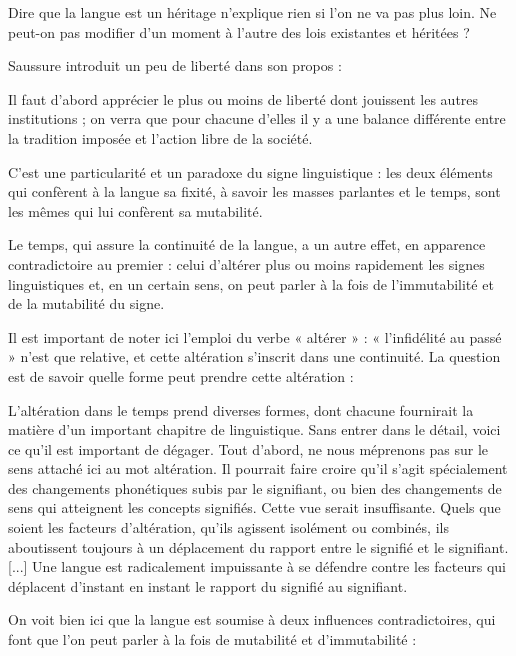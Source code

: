 \begin{lecture}{}
Dire que la langue est un héritage n’explique rien si l’on ne va pas plus loin. Ne peut-on pas modifier d’un moment à l’autre des lois existantes et héritées ?
\end{lecture}
Saussure introduit un peu de liberté dans son propos :
\begin{lecture}{}
Il faut d’abord apprécier le plus ou moins de liberté dont jouissent les autres institutions ; on verra que pour chacune d’elles il y a une balance différente entre la tradition imposée et l’action libre de la société.
\end{lecture}

C’est une particularité et un paradoxe du signe linguistique : les deux éléments qui confèrent à la langue sa fixité, à savoir les masses parlantes et le temps, sont les mêmes qui lui confèrent sa mutabilité.
\begin{lecture}{}
Le temps, qui assure la continuité de la langue, a un autre effet, en apparence contradictoire au premier : celui d’altérer plus ou moins rapidement les signes linguistiques et, en un certain sens, on peut parler à la fois de l’immutabilité et de la mutabilité du signe.
\end{lecture}
Il est important de noter ici l’emploi du verbe « altérer » : « l’infidélité au passé » n’est que relative, et cette altération s’inscrit dans une continuité. La question est de savoir quelle forme peut prendre cette altération :
\begin{lecture}{}
L’altération dans le temps prend diverses formes, dont chacune fournirait la matière d’un important chapitre de linguistique. Sans entrer dans le détail, voici ce qu’il est important de dégager. Tout d’abord, ne nous méprenons pas sur le sens attaché ici au mot altération. Il pourrait faire croire qu’il s’agit spécialement des changements phonétiques subis par le signifiant, ou bien des changements de sens qui atteignent les concepts signifiés. Cette vue serait insuffisante. Quels que soient les facteurs d’altération, qu’ils agissent isolément ou combinés, ils aboutissent toujours à un déplacement du rapport entre le signifié et le signifiant. [...] Une langue est radicalement impuissante à se défendre contre les facteurs qui déplacent d’instant en instant le rapport du signifié au signifiant.
\end{lecture}
On voit bien ici que la langue est soumise à deux influences contradictoires, qui font que l’on peut parler à la fois de mutabilité et d’immutabilité :
